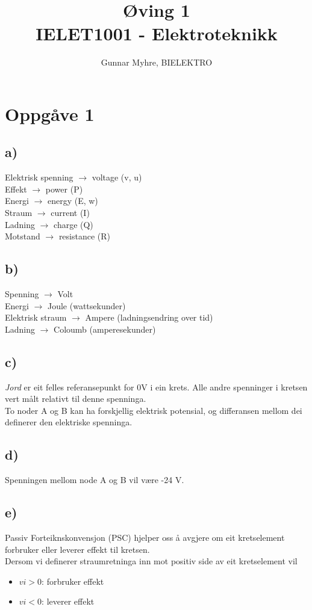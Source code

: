 \documentclass[12pt,a4paper]{article}
\title{%
  Øving 1 \\
  \large IELET1001 - Elektroteknikk \\
  }
\author{Gunnar Myhre, BIELEKTRO}
\begin{document}
  \maketitle
  
  \section{Oppgåve 1}
    \subsection{a)}
      Elektrisk spenning $\rightarrow$ voltage (v, u)\\
      Effekt $\rightarrow$ power (P) \\
      Energi $\rightarrow$ energy (E, w)\\
      Straum $\rightarrow$ current (I) \\
      Ladning $\rightarrow$ charge (Q) \\
      Motstand $\rightarrow$ resistance (R) \\

    \subsection{b)}
      Spenning $\rightarrow$ Volt \\
      Energi $\rightarrow$ Joule (wattsekunder) \\
      Elektrisk straum $\rightarrow$ Ampere (ladningsendring over tid) \\
      Ladning $\rightarrow$ Coloumb (amperesekunder) \\

    \subsection{c)}
      \textit{Jord} er eit felles referansepunkt for 0V i ein krets. Alle andre spenninger
      i kretsen vert målt relativt til denne spenninga. \\
      To noder A og B kan ha forskjellig elektrisk potensial, og differansen mellom dei
      definerer den elektriske spenninga.

    \subsection{d)}
      Spenningen mellom node A og B vil være -24 V.

    \subsection{e)}
      Passiv Forteiknskonvensjon (PSC) hjelper oss å avgjere om eit kretselement forbruker
      eller leverer effekt til kretsen. \\
      Dersom vi definerer straumretninga inn mot positiv side av eit kretselement vil
      \begin{itemize}
        \item $vi>0$: forbruker effekt
        \item $vi<0$: leverer effekt
      \end{itemize}
  
\end{document}
